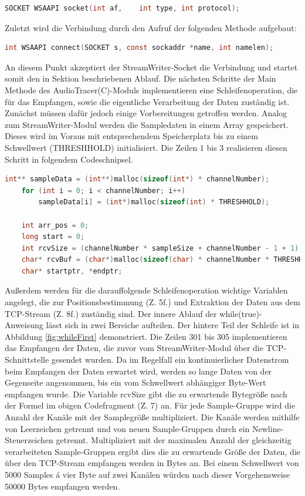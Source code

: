 \begin{lstlisting}[language=C, frame=none]
	SOCKET WSAAPI socket(int af,	int type, int protocol);
\end{lstlisting}

Zuletzt wird die Verbindung durch den Aufruf der folgenden Methode aufgebaut:
\begin{lstlisting}[language=C, frame=none]
	int WSAAPI connect(SOCKET s, const sockaddr *name, int namelen);
\end{lstlisting}

An diesem Punkt akzeptiert der StreamWriter-Socket die Verbindung und startet somit den in Sektion  beschriebenen Ablauf. Die nächsten Schritte der Main Methode des AudioTracer(C)-Moduls implementieren eine Schleifenoperation, die für das Empfangen, sowie die eigentliche Verarbeitung der Daten zuständig ist. Zunächst müssen dafür jedoch einige Vorbereitungen getroffen werden. Analog zum StreamWriter-Modul werden die Sampledaten in einem Array gespeichert. Dieses wird im Voraus mit entsprechendem Speicherplatz bis zu einem Schwellwert (THRESHHOLD) initialisiert. Die Zeilen 1 bis 3 realisieren diesen Schritt in folgendem Codeschnipsel.

\begin{lstlisting}[language=C, frame=none]
	int** sampleData = (int**)malloc(sizeof(int*) * channelNumber);
	for (int i = 0; i < channelNumber; i++)
		sampleData[i] = (int*)malloc(sizeof(int) * THRESHHOLD);
	
	int arr_pos = 0;
	long start = 0;
	int rcvSize = (channelNumber * sampleSize + channelNumber - 1 + 1) * THRESHHOLD;
	char* rcvBuf = (char*)malloc(sizeof(char) * channelNumber * THRESHHOLD);
	char* startptr, *endptr;
\end{lstlisting}

Außerdem werden für die darauffolgende Schleifenoperation wichtige Variablen angelegt, die zur Positionsbestimmung (Z. 5f.) und Extraktion der Daten aus dem TCP-Stream (Z. 8f.) zuständig sind. Der innere Ablauf der while(true)-Anweisung lässt sich in zwei Bereiche aufteilen. Der hintere Teil der Schleife ist in Abbildung \ref{fig:whileFirst} demonstriert. Die Zeilen 301 bis 305 implementieren das Empfangen der Daten, die zuvor vom StreamWriter-Modul über die TCP-Schnittstelle gesendet wurden. Da im Regelfall ein kontinuierlicher Datenstrom beim Empfangen der Daten erwartet wird, werden so lange Daten von der Gegenseite angenommen, bis ein vom Schwellwert abhängiger Byte-Wert empfangen wurde. Die Variable rcvSize gibt die zu erwartende Bytegröße nach der Formel im obigen Codefragment (Z. 7) an. Für jede Sample-Gruppe wird die Anzahl der Kanäle mit der Samplegröße multipliziert. Die Kanäle werden mithilfe von Leerzeichen getrennt und von neuen Sample-Gruppen durch ein Newline-Steuerzeichen getrennt. Multipliziert mit der maximalen Anzahl der gleichzeitig verarbeiteten Sample-Gruppen ergibt dies die zu erwartende Größe der Daten, die über den TCP-Stream empfangen werden in Bytes an. Bei einem Schwellwert von 5000 Samples á vier Byte auf zwei Kanälen würden nach dieser Vorgehensweise 50000 Bytes empfangen werden.

